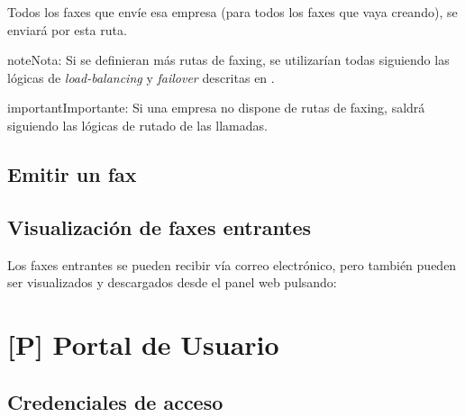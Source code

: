 \documentclass[letterpaper,10pt,spanish]{sphinxmanual}
\begin{document}

Todos los faxes que envíe esa empresa (para todos los faxes que vaya creando), se enviará por esta ruta.

\begin{notice}{note}{Nota:}
Si se definieran más rutas de faxing, se utilizarían todas siguiendo las lógicas de \emph{load-balancing} y \emph{failover} descritas en {\hyperref[external_outgoing_calls/call_routing:routes\string-metrics]{}}.
\end{notice}

\begin{notice}{important}{Importante:}
Si una empresa no dispone de rutas de faxing, saldrá siguiendo las lógicas de rutado de las llamadas.
\end{notice}


\section{Emitir un fax}
\label{faxing/index:emitir-un-fax}



\section{Visualización de faxes entrantes}
\label{faxing/index:visualizacion-de-faxes-entrantes}
Los faxes entrantes se pueden recibir vía correo electrónico, pero también pueden ser visualizados y descargados desde el panel web pulsando:

\noindent{}


\chapter{{[}P{]} Portal de Usuario}
\label{userportal/index:userportal}\label{userportal/index::doc}\label{userportal/index:p-portal-de-usuario}

\section{Credenciales de acceso}
\label{userportal/index:credenciales-de-acceso}
\end{document}
